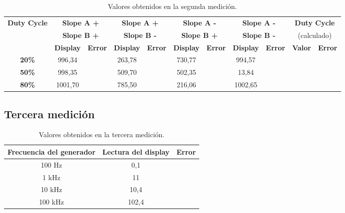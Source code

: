 \documentclass{article}
\begin{document}
\begin{table}[!hbt]
	\begin{center}

		\begin{tabular}{|c|c|c|c|c|c|c|c|c|c|c|} \hline
			\multirow{3}{*}{\textbf{Duty Cycle}}
			& \multicolumn{2}{c|}{\textbf{Slope A +}} & \multicolumn{2}{c|}{\textbf{Slope A +}} & \multicolumn{2}{c|}{\textbf{Slope A -}} & \multicolumn{2}{c|}{\textbf{Slope A -}} & \multicolumn{2}{c|}{\textbf{Duty Cycle}} \\
			& \multicolumn{2}{c|}{\textbf{Slope B +}} & \multicolumn{2}{c|}{\textbf{Slope B -}} & \multicolumn{2}{c|}{\textbf{Slope B +}} & \multicolumn{2}{c|}{\textbf{Slope B -}} & \multicolumn{2}{c|}{(calculado)} \\\cline{2-11}
			& \textbf{Display} & \textbf{Error} & \textbf{Display} & \textbf{Error} & \textbf{Display} & \textbf{Error} & \textbf{Display} & \textbf{Error} & \textbf{Valor} & \textbf{Error} \\\hline
			
			\textbf{20\%} & 996,34 &  & 263,78 &  & 730,77 &  & 994,57 &  &  &  \\\hline
			\textbf{50\%} & 998,35 &  & 509,70 &  & 502,35 &  & 13,84 &  &  &  \\\hline
			\textbf{80\%} & 1001,70 &  & 785,50 &  & 216,06 &  & 1002,65 &  &  &  \\\hline
		\end{tabular}

	\caption{Valores obtenidos en la segunda medición.}
	\end{center}
\end{table}
\medskip
	


\subsection{Tercera medición}


\begin{table}[!hbt]
	\begin{center}
		\begin{tabular}{|c|c|c|} \hline
			\textbf{Frecuencia del generador} & \textbf{Lectura del display} & \textbf{Error} \\\hline
			100 Hz & 0,1 &  \\\hline
			1 kHz & 11 &  \\\hline
			10 kHz & 10,4 &  \\\hline
			100 kHz & 102,4 &  \\\hline
		\end{tabular}

	\caption{Valores obtenidos en la tercera medición.}
	\end{center}
\end{table}
\medskip
\end{document}
